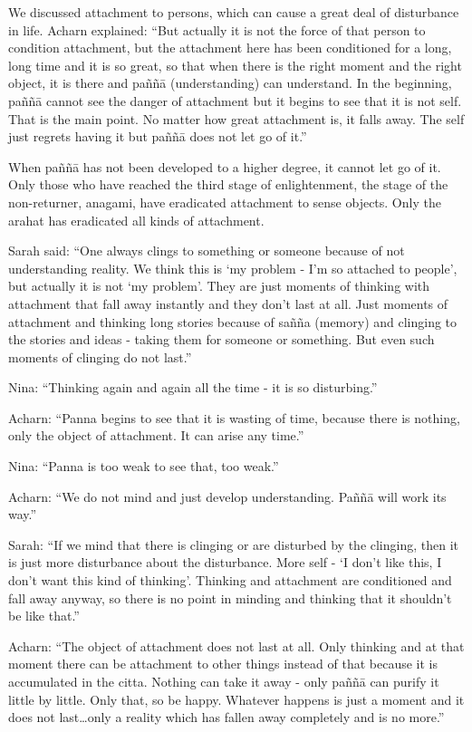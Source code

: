 We discussed attachment to persons, which can cause a great deal of disturbance in life. Acharn explained: ``But actually it is not the force of that person to 
condition attachment, but the attachment here has been conditioned for a long, 
long time and it is so great, so that when there is the right moment and the right 
object, it is there and paññā (understanding) can understand. In the beginning, 
paññā cannot see the danger of attachment but it begins to see that it is not self. 
That is the main point. No matter how great attachment is, it falls away. The self 
just regrets having it but paññā does not let go of it.'' 

When paññā has not been developed to a higher degree, it cannot let go of it. 
Only those who have reached the third stage of enlightenment, the stage of the 
non-returner, anagami, have eradicated attachment to sense objects. Only the 
arahat has eradicated all kinds of attachment. 

Sarah said: ``One always clings to something or someone because of not understanding reality. We think this is `my problem - I'm so attached to people', but 
actually it is not `my problem'. They are just moments of thinking with attachment that fall away instantly and they don't last at all. Just moments of attachment and thinking long stories because of sañña (memory) and clinging to the 
stories and ideas - taking them for someone or something. But even such moments of clinging do not last.'' 

Nina: ``Thinking again and again all the time - it is so disturbing.'' 

Acharn: ``Panna begins to see that it is wasting of time, because there is nothing, 
only the object of attachment. It can arise any time.'' 

Nina: ``Panna is too weak to see that, too weak.'' 

Acharn: ``We do not mind and just develop understanding. Paññā will work its 
way.'' 

Sarah: ``If we mind that there is clinging or are disturbed by the clinging, then it 
is just more disturbance about the disturbance. More self - `I don't like this, I 
don't want this kind of thinking'. Thinking and attachment are conditioned and 
fall away anyway, so there is no point in minding and thinking that it shouldn't 
be like that.'' 

Acharn: ``The object of attachment does not last at all. Only thinking and at that 
moment there can be attachment to other things instead of that because it is accumulated in the citta. Nothing can take it away - only paññā can purify it little 
by little. Only that, so be happy. Whatever happens is just a moment and it does 
not last\ldots only a reality which has fallen away completely and is no more.'' 

